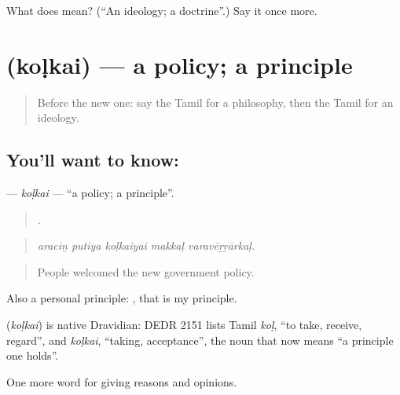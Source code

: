 \begin{tcolorbox}[breakable,colback=teal!4,colframe=teal!35!black,title={Before you move on}]
What does  mean? (\textquotedblleft{}An ideology; a doctrine\textquotedblright{}.) Say it once more.
\end{tcolorbox}
\section[\texorpdfstring{\ta{கொள்கை} (koḷkai)}{கொள்கை (koḷkai)}]{ (koḷkai) — a policy; a principle}

\label{lesson:TA-C358-kolkai}



\begin{quote}
Before the new one: say the Tamil for a philosophy, then the Tamil for an ideology.
\end{quote}

\subsection*{You'll want to know: }
\textbf{} — \emph{koḷkai} — \textquotedblleft{}a policy; a principle\textquotedblright{}.

\begin{quote}
    .
\end{quote}

\begin{quote}
\emph{araciṉ putiya koḷkaiyai makkaḷ varavēṟṟārkaḷ.}
\end{quote}

\begin{quote}
People welcomed the new government policy.
\end{quote}

Also a personal principle:   , that is my principle.

\begin{cousinweb}
\textbf{} (\emph{koḷkai}) is native Dravidian: DEDR 2151 lists Tamil \emph{koḷ}, \textquotedblleft{}to take, receive, regard\textquotedblright{}, and \emph{koḷkai}, \textquotedblleft{}taking, acceptance\textquotedblright{}, the noun that now means \textquotedblleft{}a principle one holds\textquotedblright{}.
\end{cousinweb}

\begin{grammarlens}[title={What you've built}]
One more word for giving reasons and opinions.
\end{grammarlens}

